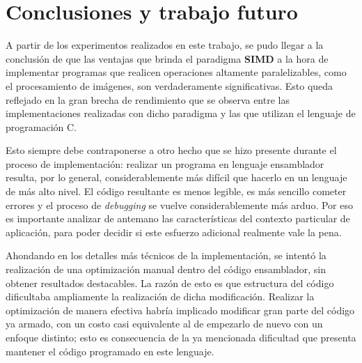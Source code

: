 \section{Conclusiones y trabajo futuro}

    A partir de los experimentos realizados en este trabajo, se pudo llegar a la conclusión de que las ventajas que brinda el paradigma \textbf{SIMD} a la hora de implementar programas que realicen operaciones altamente paralelizables, como el procesamiento de imágenes, son verdaderamente significativas. Esto queda reflejado en la gran brecha de rendimiento que se observa entre las implementaciones realizadas con dicho paradigma y las que utilizan el lenguaje de programación C.

    Esto siempre debe contraponerse a otro hecho que se hizo presente durante el proceso de implementación: realizar un programa en lenguaje ensamblador resulta, por lo general, considerablemente más difícil que hacerlo en un lenguaje de más alto nivel. El código resultante es menos legible, es más sencillo cometer errores y el proceso de \emph{debugging} se vuelve considerablemente más arduo. Por eso es importante analizar de antemano las características del contexto particular de aplicación, para poder decidir si este esfuerzo adicional realmente vale la pena.

    Ahondando en los detalles más técnicos de la implementación, se intentó la realización de una optimización manual dentro del código ensamblador, sin obtener resultados destacables. La razón de esto es que estructura del código dificultaba ampliamente la realización de dicha modificación. Realizar la optimización de manera efectiva habría implicado modificar gran parte del código ya armado, con un costo casi equivalente al de empezarlo de nuevo con un enfoque distinto; esto es consecuencia de la ya mencionada dificultad que presenta mantener el código programado en este lenguaje.
